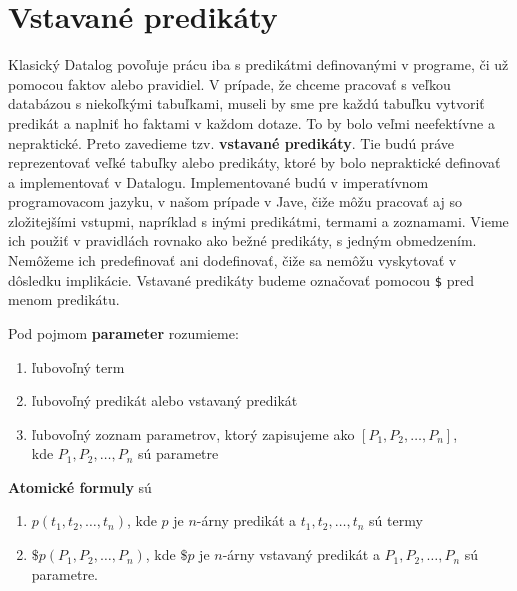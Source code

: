\section{Vstavané predikáty}

Klasický Datalog povoľuje prácu iba s predikátmi definovanými v programe, či už pomocou faktov alebo
pravidiel. V prípade, že chceme pracovať s veľkou databázou s niekoľkými tabuľkami, museli by sme
pre každú tabuľku vytvoriť predikát a naplniť ho faktami v každom dotaze. To by bolo veľmi
neefektívne a nepraktické. Preto zavedieme tzv. \textbf{vstavané predikáty}. Tie budú práve
reprezentovať veľké tabuľky alebo predikáty, ktoré by bolo nepraktické definovať a implementovať v
Datalogu. Implementované budú v imperatívnom programovacom jazyku, v našom prípade v Jave, čiže môžu
pracovať aj so zložitejšími vstupmi, napríklad s inými predikátmi, termami a zoznamami. Vieme ich
použiť v pravidlách rovnako ako bežné predikáty, s jedným obmedzením. Nemôžeme ich predefinovať ani
dodefinovať, čiže sa nemôžu vyskytovať v dôsledku implikácie. Vstavané predikáty budeme označovať
pomocou \texttt{\$} pred menom predikátu.

\begin{definition}
    \label{parameter}
    Pod pojmom \textbf{parameter} rozumieme:
    \begin{enumerate}
        \item ľubovoľný term
        \item ľubovoľný predikát alebo vstavaný predikát
        \item ľubovoľný zoznam parametrov, ktorý zapisujeme ako $[P_1, P_2, \dots, P_n]$,\\ kde
        $P_1, P_2, \dots, P_n$ sú parametre
    \end{enumerate}
\end{definition}

\begin{definition}
    \textbf{Atomické formuly} sú
    \begin{enumerate}
        \item $p(t_1, t_2, \dots, t_n)$, kde $p$ je $n$-árny predikát a $t_1, t_2, \dots, t_n$ sú
        termy
        \item $\$p(P_1, P_2, \dots, P_n)$, kde $\$p$ je $n$-árny vstavaný predikát a $P_1, P_2,
        \dots, P_n$ sú parametre.
    \end{enumerate}
\end{definition}
